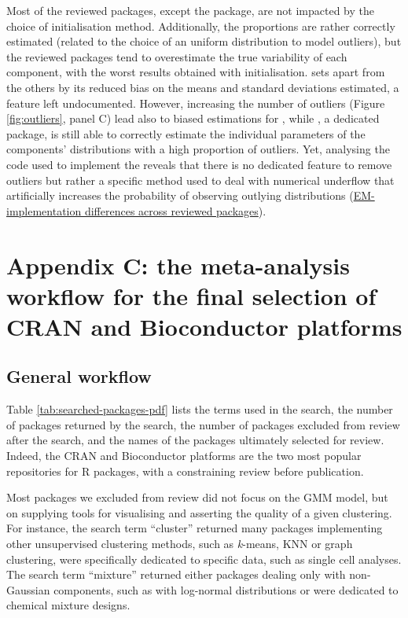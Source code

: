 Most of the reviewed packages, except the  package, are not
impacted by the choice of initialisation method. Additionally, the
proportions are rather correctly estimated (related to the choice of an
uniform distribution to model outliers), but the reviewed packages tend
to overestimate the true variability of each component, with the worst
results obtained with  initialisation.  sets apart
from the others by its reduced bias on the means and standard deviations
estimated, a feature left undocumented. However, increasing the number
of outliers (Figure \ref{fig:outliers}, panel C) lead also to biased
estimations for , while , a dedicated package, is
still able to correctly estimate the individual parameters of the
components' distributions with a high proportion of outliers. Yet,
analysing the code used to implement the  reveals that there
is no dedicated feature to remove outliers but rather a specific method
used to deal with numerical underflow that artificially increases the
probability of observing outlying distributions (\protect\hyperlink{em-implementation-differences-across-reviewed-packages}{EM-implementation
differences across reviewed packages}).

\hypertarget{appendix-c-the-meta-analysis-workflow-for-the-final-selection-of-cran-and-bioconductor-platforms}{%
\section{Appendix C: the meta-analysis workflow for the final selection of CRAN and Bioconductor platforms}\label{appendix-c-the-meta-analysis-workflow-for-the-final-selection-of-cran-and-bioconductor-platforms}}

\hypertarget{general-workflow}{%
\subsection{General workflow}\label{general-workflow}}

Table \ref{tab:searched-packages-pdf}
lists the terms used in the search, the number of packages returned by
the search, the number of packages excluded from review after the
search, and the names of the packages ultimately selected for review.
Indeed, the CRAN and Bioconductor platforms are the two most popular
repositories for R packages, with a constraining review before
publication.

Most packages we excluded from review did not focus on the GMM model,
but on supplying tools for visualising and asserting the quality of a
given clustering. For instance, the search term ``cluster'' returned many
packages implementing other unsupervised clustering methods, such as
\emph{k}-means, KNN or graph clustering, were specifically dedicated to
specific data, such as single cell analyses. The search term ``mixture''
returned either packages dealing only with non-Gaussian components, such
as  with log-normal distributions or were dedicated to chemical mixture designs.

